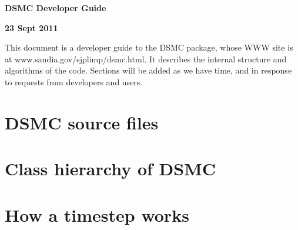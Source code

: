 \documentclass{article}
\begin{document}
\centerline{\Large \bf DSMC Developer Guide}
\centerline{\bf 23 Sept 2011}

\vspace{0.5in}

This document is a developer guide to the DSMC package, whose WWW site
is at www.sandia.gov/sjplimp/dsmc.html.  It describes the internal
structure and algorithms of the code.  Sections will be added as we
have time, and in response to requests from developers and users.

\tableofcontents

\pagebreak
\section{DSMC source files}

\pagebreak
\section{Class hierarchy of DSMC}

\pagebreak
\section{How a timestep works}
\end{document}

